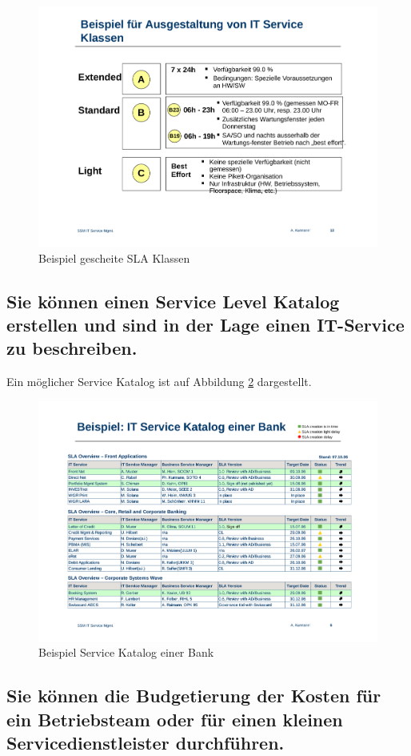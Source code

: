 \begin{figure}[h!]
\centering
\includegraphics[width=0.7\linewidth]{fig/beispiel-schlaue-sla-klassen}
\caption{Beispiel gescheite SLA Klassen}
\label{fig:beispiel-schlaue-sla-klassen}
\end{figure}

\subsection{Sie können einen Service Level Katalog erstellen und sind in der Lage einen IT-Service zu beschreiben.}

Ein möglicher Service Katalog ist auf Abbildung \ref{fig:beispiel-service-katalog} dargestellt.

\begin{figure}[h!]
\centering
\includegraphics[width=0.7\linewidth]{fig/beispiel-service-katalog}
\caption{Beispiel Service Katalog einer Bank}
\label{fig:beispiel-service-katalog}
\end{figure}

\subsection{Sie können die Budgetierung der Kosten für ein Betriebsteam oder für einen kleinen Servicedienstleister durchführen.}

